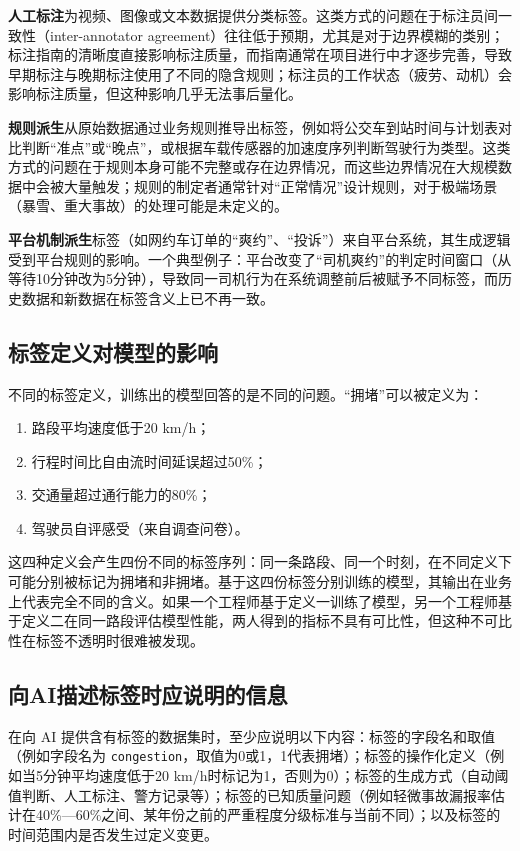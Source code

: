 \textbf{人工标注}为视频、图像或文本数据提供分类标签。这类方式的问题在于标注员间一致性（inter-annotator agreement）往往低于预期，尤其是对于边界模糊的类别；标注指南的清晰度直接影响标注质量，而指南通常在项目进行中才逐步完善，导致早期标注与晚期标注使用了不同的隐含规则；标注员的工作状态（疲劳、动机）会影响标注质量，但这种影响几乎无法事后量化。

\textbf{规则派生}从原始数据通过业务规则推导出标签，例如将公交车到站时间与计划表对比判断“准点”或“晚点”，或根据车载传感器的加速度序列判断驾驶行为类型。这类方式的问题在于规则本身可能不完整或存在边界情况，而这些边界情况在大规模数据中会被大量触发；规则的制定者通常针对“正常情况”设计规则，对于极端场景（暴雪、重大事故）的处理可能是未定义的。

\textbf{平台机制派生}标签（如网约车订单的“爽约”、“投诉”）来自平台系统，其生成逻辑受到平台规则的影响。一个典型例子：平台改变了“司机爽约”的判定时间窗口（从等待10分钟改为5分钟），导致同一司机行为在系统调整前后被赋予不同标签，而历史数据和新数据在标签含义上已不再一致。

\subsection{标签定义对模型的影响}

不同的标签定义，训练出的模型回答的是不同的问题。“拥堵”可以被定义为：

\begin{enumerate}
  \item 路段平均速度低于20 km/h；
  \item 行程时间比自由流时间延误超过50\%；
  \item 交通量超过通行能力的80\%；
  \item 驾驶员自评感受（来自调查问卷）。
\end{enumerate}

这四种定义会产生四份不同的标签序列：同一条路段、同一个时刻，在不同定义下可能分别被标记为拥堵和非拥堵。基于这四份标签分别训练的模型，其输出在业务上代表完全不同的含义。如果一个工程师基于定义一训练了模型，另一个工程师基于定义二在同一路段评估模型性能，两人得到的指标不具有可比性，但这种不可比性在标签不透明时很难被发现。

\subsection{向AI描述标签时应说明的信息}

在向 AI 提供含有标签的数据集时，至少应说明以下内容：标签的字段名和取值（例如字段名为 \texttt{congestion}，取值为0或1，1代表拥堵）；标签的操作化定义（例如当5分钟平均速度低于20 km/h时标记为1，否则为0）；标签的生成方式（自动阈值判断、人工标注、警方记录等）；标签的已知质量问题（例如轻微事故漏报率估计在40\%—60\%之间、某年份之前的严重程度分级标准与当前不同）；以及标签的时间范围内是否发生过定义变更。

